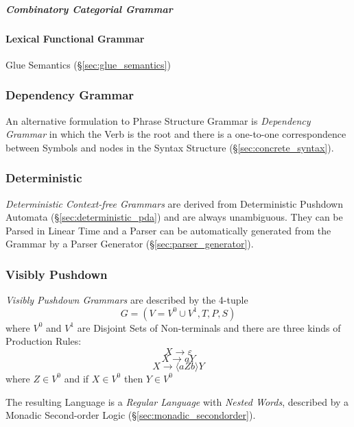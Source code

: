 \subparagraph{Combinatory Categorial Grammar}
\label{sec:combinatory_categorial}



\paragraph{Lexical Functional Grammar}\label{sec:lexical_functional}

Glue Semantics (\S\ref{sec:glue_semantics})



\subsubsection{Dependency Grammar}\label{sec:dependency_grammar}

An alternative formulation to Phrase Structure Grammar is
\emph{Dependency Grammar} in which the Verb is the root and there is a
one-to-one correspondence between Symbols and nodes in the Syntax
Structure (\S\ref{sec:concrete_syntax}).



\subsubsection{Deterministic}\label{sec:deterministic_cfg}

\emph{Deterministic Context-free Grammars} are derived from
Deterministic Pushdown Automata (\S\ref{sec:deterministic_pda}) and
are always unambiguous. They can be Parsed in Linear Time and a Parser
can be automatically generated from the Grammar by a Parser Generator
(\S\ref{sec:parser_generator}).



\subsubsection{Visibly Pushdown}\label{sec:visibly_pushdown}

\emph{Visibly Pushdown Grammars} are described by the 4-tuple
\[
  G = (V=V^0 \cup V^1,T,P,S)
\]
where $V^0$ and $V^1$ are Disjoint Sets of Non-terminals and there
are three kinds of Production Rules:
\[
  X \rightarrow \varepsilon
\]\[
  X \rightarrow aY
\]\[
  X \rightarrow \langle aZb \rangle Y
\]
where $Z \in V^0$ and if $X \in V^0$ then $Y \in V^0$

The resulting Language is a \emph{Regular Language} with \emph{Nested
  Words}, described by a Monadic Second-order Logic
(\S\ref{sec:monadic_secondorder}).



